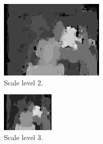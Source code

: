 \documentclass[12pt,a4paper,oneside,final]{article}
\begin{document}
\begin{table}[H]
\begin{subtable}{1\textwidth}
{\begin{figure}[H]
\begin{subfigure}[b]{0.24\textwidth}
				\includegraphics[width=\textwidth]{disparity2set_1.png}
				\caption{Scale level 2.}
			\end{subfigure}
			\begin{subfigure}[b]{0.24\textwidth}
				\includegraphics[width=\textwidth]{disparity3set_1.png}
				\caption{Scale level 3.}
			\end{subfigure}
			\begin{subfigure}[b]{0.24\textwidth}

\end{subfigure}
\end{figure}}
\end{subtable}
\end{table}
\end{document}

